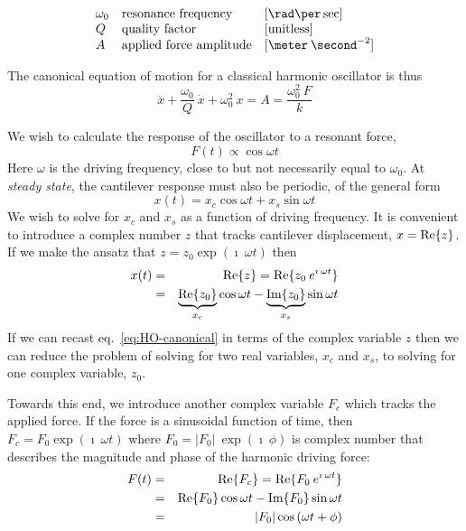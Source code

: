 \[
\begin{array}{lll}
 \omega_0 &\mbox{resonance frequency} & [\rad \per \sec] \\
 Q & \mbox{quality factor} & [\mbox{unitless}] \\
 A & \mbox{applied force amplitude} & [\meter \: \second^{-2}]
\end{array}
\]

The canonical equation of motion for a classical harmonic oscillator is thus
\begin{equation}
\ddot{x} + \frac{\omega_0}{Q} \: \dot{x} + \omega_0^2 \: x = A = \frac{\omega_0^2 \: F}{k}
\label{eq:HO-canonical}
\end{equation}


\label{sect:phasors}

We wish to calculate the response of the oscillator to a resonant
force,
\[
F(t) \propto \cos{\omega t}
\]
Here $\omega$ is the driving frequency, close to but not necessarily
equal to $\omega_0$.  At \emph{steady state}, the cantilever response
must also be periodic, of the general form
\begin{equation}
x(t) = x_c \cos{\omega t} + x_s \sin{\omega t}
\end{equation}
We wish to solve for $x_c$ and $x_s$ as a function of driving frequency.
It is convenient to introduce a complex number $z$ that tracks
cantilever displacement, $x = \mbox{Re}\{z\}$.  If we make the ansatz that
$z = z_0 \exp{(\imath \: \omega t)}$ then
\begin{eqnarray}
x(t) & = & \mbox{Re}\{z\} = \mbox{Re}\{z_0 \: e^{\imath \: \omega t}\} \\
     & = & \underbrace{\mbox{Re}\{z_0\}}_{x_c} \cos{\omega t} - \underbrace{\mbox{Im}\{z_0\}}_{x_s} \sin{\omega t}
\end{eqnarray}
If we can recast eq.~\ref{eq:HO-canonical} in terms of the complex
variable $z$ then we can reduce the problem of solving for two real
variables, $x_c$ and $x_s$, to solving for one complex variable,
$z_0$.

Towards this end, we introduce another complex variable $F_c$ which
tracks the applied force.  If the force is a sinusoidal function of
time, then $F_c = F_0 \exp{(\imath \: \omega t)}$ where $F_0 = | F_0 |
\: \exp{(\imath \: \phi)}$ is complex number that describes the
magnitude and phase of the harmonic driving force:
\begin{eqnarray}
F(t) & = & \mbox{Re}\{F_c\} = \mbox{Re}\{F_0 \: e^{\imath \: \omega t}\} \\
     & = & \mbox{Re}\{F_0\} \cos{\omega t} - \mbox{Im}\{F_0\} \sin{\omega t} \\
     & = & | F_0 | \cos{(\omega t + \phi)}
\end{eqnarray}

